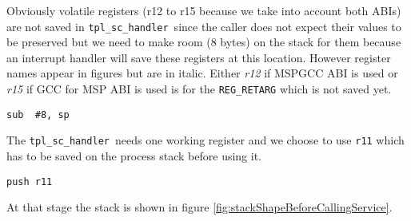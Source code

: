 \documentclass[11pt, oneside]{article}   	%
\newcommand{\sch}{\lstinline{tpl_sc_handler}}
\begin{document}
\begin{center}
\end{center}

Obviously volatile registers (r12 to r15 because we take into account both ABIs) are not saved in \sch\ since the caller does not expect their values to be preserved but we need to make room (8 bytes) on the stack for them because an interrupt handler will save these registers at this location. However register names appear in figures but are in italic. Either \textit{r12} if MSPGCC ABI is used or \textit{r15} if GCC for MSP ABI is used is for the \lstinline{REG_RETARG} which is not saved yet.

\begin{lstlisting}[backgroundcolor=\color{yellow!15}]
    sub  #8, sp
\end{lstlisting}

The \sch\ needs one working register and we choose to use \lstinline{r11} which has to be saved on the process stack before using it.

\begin{lstlisting}[backgroundcolor=\color{yellow!15}]
    push r11
\end{lstlisting}

At that stage the stack is shown in figure \ref{fig:stackShapeBeforeCallingService}.
\end{document}
